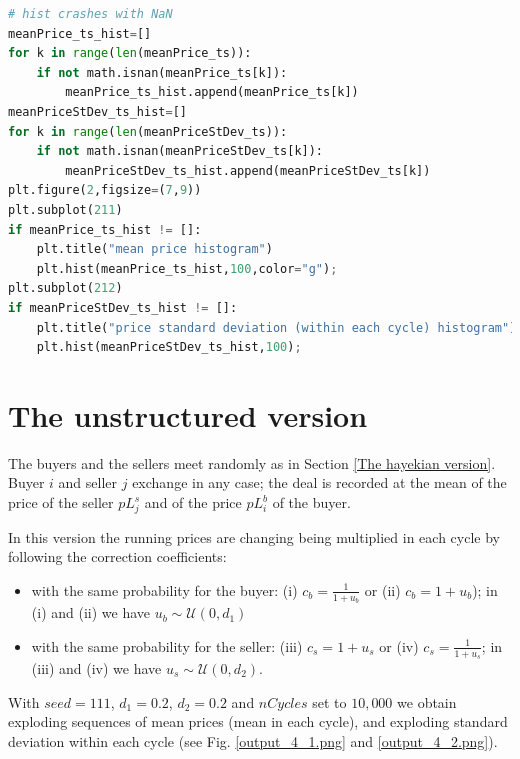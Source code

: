 \documentclass[12pt]{report}
\begin{document}
\begin{lstlisting}[language=Python, caption=The model in the hayekian perspective, basicstyle=\ttfamily\footnotesize]
# hist crashes with NaN
meanPrice_ts_hist=[]
for k in range(len(meanPrice_ts)): 
    if not math.isnan(meanPrice_ts[k]):
        meanPrice_ts_hist.append(meanPrice_ts[k])
meanPriceStDev_ts_hist=[]
for k in range(len(meanPriceStDev_ts)): 
    if not math.isnan(meanPriceStDev_ts[k]):
        meanPriceStDev_ts_hist.append(meanPriceStDev_ts[k])
plt.figure(2,figsize=(7,9))
plt.subplot(211)
if meanPrice_ts_hist != []:
    plt.title("mean price histogram")
    plt.hist(meanPrice_ts_hist,100,color="g");
plt.subplot(212)
if meanPriceStDev_ts_hist != []:
    plt.title("price standard deviation (within each cycle) histogram")
    plt.hist(meanPriceStDev_ts_hist,100);
\end{lstlisting}


\section{The unstructured version}\label{The unstructured version}

The buyers and the sellers meet randomly as in Section \ref{The hayekian version}. Buyer $i$ and seller $j$ exchange in any case; the deal is recorded at the mean of the price of the seller $pL^s_j$ and of the price $pL^b_i$ of the buyer.

In this version the running prices are changing being multiplied in each cycle by following the correction coefficients:

\begin{itemize}

\item with the same probability for the buyer: (i) $c_b=\frac{1} {1 + u_b}$ or (ii) $c_b=1 + u_b$); in (i) and (ii) we have $u_b\sim\mathcal{U}(0,d_1)$

\item  with the same probability for the seller: (iii) $c_s=1 + u_s$ or (iv) $c_s=\frac{1} {1 + u_s}$; in (iii) and (iv) we have $u_s\sim\mathcal{U}(0,d_2)$.
\end{itemize}

With $seed=111$, $d_1=0.2$, $d_2=0.2$ and $nCycles$ set to $10,000$ we obtain exploding sequences of mean prices (mean in each cycle), and exploding standard deviation within each cycle (see Fig. \ref{output_4_1.png} and \ref{output_4_2.png}).
\end{document}
